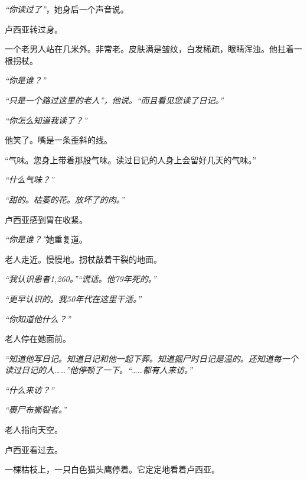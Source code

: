 \noindent \textit{\textquotedblleft{}你读过了\textquotedblright{}}，她身后一个声音说。

\noindent 卢西亚转过身。

\noindent 一个老男人站在几米外。非常老。皮肤满是皱纹，白发稀疏，眼睛浑浊。他拄着一根拐杖。

\noindent \textit{\textquotedblleft{}你是谁？\textquotedblright{}}

\noindent \textit{\textquotedblleft{}只是一个路过这里的老人\textquotedblright{}，他说。\textquotedblleft{}而且看见您读了日记。\textquotedblright{}}

\noindent \textit{\textquotedblleft{}你怎么知道我读了？\textquotedblright{}}

\noindent 他笑了。嘴是一条歪斜的线。

\noindent \textquotedblleft{气味。您身上带着那股气味。读过日记的人身上会留好几天的气味。\textquotedblright{}}

\noindent \textit{\textquotedblleft{}什么气味？\textquotedblright{}}

\noindent \textit{\textquotedblleft{}甜的。枯萎的花。放坏了的肉。\textquotedblright{}}

\noindent 卢西亚感到胃在收紧。

\noindent \textit{\textquotedblleft{}你是谁？\textquotedblright{}}她重复道。

\noindent 老人走近。慢慢地。拐杖敲着干裂的地面。

\noindent \textit{\textquotedblleft{}我认识患者1,260。\textquotedblright{}}\textit{\textquotedblleft{}谎话。他79年死的。\textquotedblright{}}

\noindent \textit{\textquotedblleft{}更早认识的。我50年代在这里干活。\textquotedblright{}}

\noindent \textit{\textquotedblleft{}你知道他什么？\textquotedblright{}}

\noindent 老人停在她面前。

\noindent \textit{\textquotedblleft{}知道他写日记。知道日记和他一起下葬。知道掘尸时日记是温的。还知道每一个读过日记的人……\textquotedblright{}他停顿了一下。\textquotedblleft{}……都有人来访。\textquotedblright{}}

\noindent \textit{\textquotedblleft{}什么来访？\textquotedblright{}}

\noindent \textit{\textquotedblleft{}裹尸布撕裂者。\textquotedblright{}}

\noindent 老人指向天空。

\noindent 卢西亚看过去。

\noindent 一棵枯枝上，一只白色猫头鹰停着。它定定地看着卢西亚。

